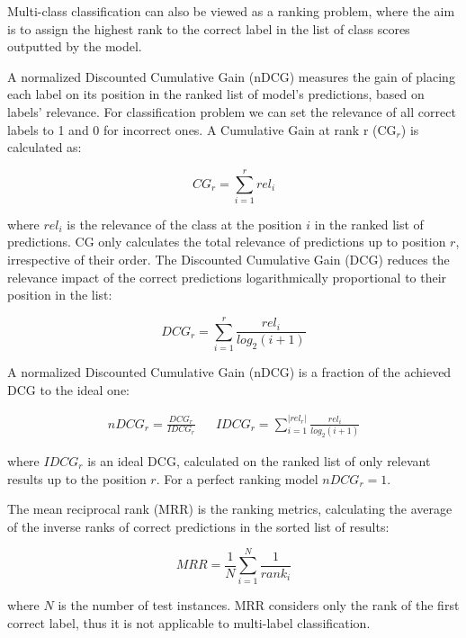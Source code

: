 Multi-class classification can also be viewed as a ranking problem, where the aim is to assign the highest rank to the correct label in the list of class scores outputted by the model. 

 A normalized Discounted Cumulative Gain (nDCG) measures the gain of placing each label on its position in the ranked list of model's predictions, based on labels' relevance. For classification problem we can set the relevance of all correct labels to 1 and 0 for incorrect ones. A Cumulative Gain at rank r (CG$_r$) is calculated as:

\begin{equation}
    CG_r = \sum_{i=1}^r rel_i
\end{equation}

where $rel_i$ is the relevance of the class at the position $i$ in the ranked list of predictions. CG only calculates the total relevance of predictions up to position $r$, irrespective of their order. The Discounted Cumulative Gain (DCG) reduces the relevance impact of the correct predictions logarithmically proportional to their position in the list:

\begin{equation}
    DCG_r = \sum_{i=1}^r \frac{rel_i}{log_2(i+1)}
\end{equation}

A normalized Discounted Cumulative Gain (nDCG) is a fraction of the achieved DCG to the ideal one:

\begin{align}
    nDCG_r = \frac{DCG_r}{IDCG_r} && IDCG_r = \sum_{i=1}^{|rel_r|} \frac{rel_i}{log_2(i+1)}
\end{align}

where $IDCG_r$ is an ideal DCG, calculated on the ranked list of only relevant results up to the position $r$. For a perfect ranking model $nDCG_r = 1$.

 The mean reciprocal rank (MRR) is the ranking metrics, calculating the average of the inverse ranks of correct predictions in the sorted list of results:

\begin{equation}
    MRR = \frac{1}{N} \sum_{i=1}^N \frac{1}{rank_i}
\end{equation}

where $N$ is the number of test instances. MRR considers only the rank of the first correct label, thus it is not applicable to multi-label classification.
